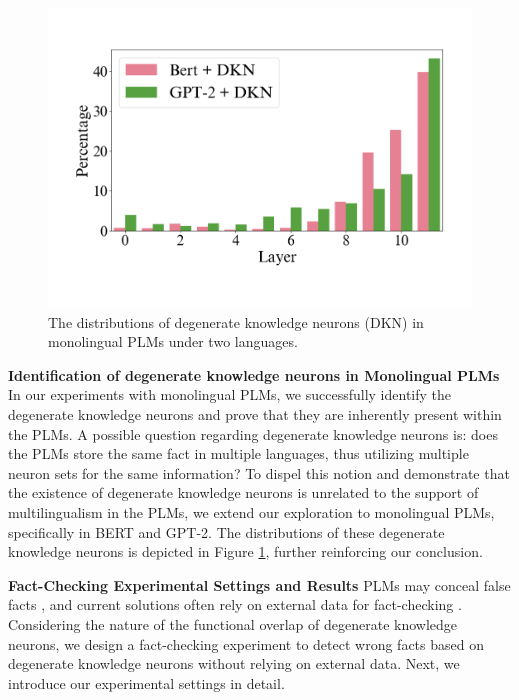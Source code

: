 \documentclass[]{article}
\newcommand{\vpara}[1]{\vspace{0.05in}\noindent\textbf{#1 }}
\begin{document}
\begin{figure}[h]
  \centering
  \includegraphics[width=0.8\linewidth]{figures/mono-d.pdf}
  \caption{The distributions of degenerate knowledge neurons (DKN) in monolingual PLMs under two languages.}
  \label{fig:mono-D-neurons_distribution}
\end{figure}
\vpara{Identification of degenerate knowledge neurons in Monolingual PLMs}
In our experiments with monolingual PLMs, we successfully identify the degenerate knowledge neurons and prove that they are inherently present within the PLMs. 
A possible question regarding degenerate knowledge neurons is: does the PLMs store the same fact in multiple languages, thus utilizing multiple neuron sets for the same information? To dispel this notion and demonstrate that the existence of degenerate knowledge neurons is unrelated to the support of multilingualism in the PLMs, we extend our exploration to monolingual PLMs, specifically in BERT and GPT-2. The distributions of these degenerate knowledge neurons is depicted in Figure \ref{fig:mono-D-neurons_distribution}, further reinforcing our conclusion.

\vpara{Fact-Checking Experimental Settings and Results}
PLMs may conceal false facts \cite{hallucination_chatgpt1,hallucination_chatgpt2}, and current solutions often rely on external data for fact-checking \cite{fact-checking-survey}. 
Considering the nature of the functional overlap of degenerate knowledge neurons, we design a fact-checking experiment to detect wrong facts based on degenerate knowledge neurons without relying on external data. Next, we introduce our experimental settings in detail.
\end{document}
